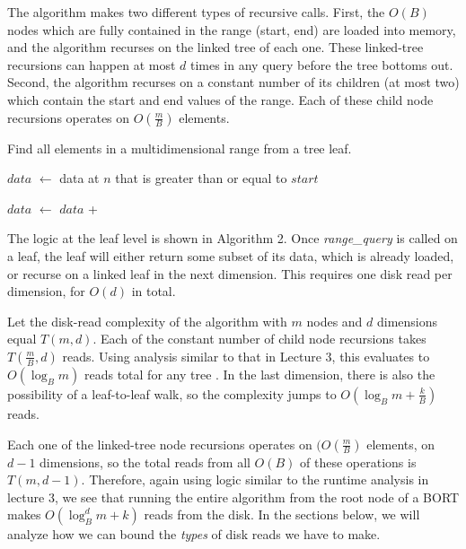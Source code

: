 \documentclass[11pt, oneside]{article}
\newcommand*\Let[2]{\State #1 $\gets$ #2}
\newcommand{\ms}{\textit}
\begin{document}
The algorithm makes two different types of recursive calls. First, the
$O(B)$ nodes which are fully contained in the range (start, end) are loaded into
memory, and the algorithm recurses on the linked tree of each one. These
linked-tree recursions can happen at most $d$ times in any query before the
tree bottoms out. Second, the algorithm recurses on a constant number of its
children (at most two) which contain the start and end values of the range.
Each of these child node recursions operates on $O(\frac{m}{B})$ elements.

\begin{algorithm}[H]
    \caption{Find all elements in a multidimensional range from a tree leaf.}
    \begin{algorithmic}[1]
            \Let{$data$}{data at $n$ that is greater than or equal to $start$}

            \Let{$data$}{$data$ + } 
            \EndIf

            \State {}
        \EndFunction
    \end{algorithmic}
\end{algorithm}

The logic at the leaf level is shown in Algorithm 2. Once \ms{range\_query} is
called on a leaf, the leaf will either return some subset of its data, which is
already loaded, or recurse on a linked leaf in the next dimension. This requires
one disk read per dimension, for $O(d)$ in total. 

Let the disk-read complexity of the algorithm with $m$ nodes and $d$ dimensions
equal $T(m, d)$. Each of the constant number of child node recursions takes
$T(\frac{m}{B}, d)$ reads. Using analysis similar to that in Lecture 3, this
evaluates to $O(\log_B m)$ reads total for any tree \cite{lecture}. In the last
dimension, there is also the possibility of a leaf-to-leaf walk, so the
complexity jumps to $O(\log_B m + \frac{k}{B})$ reads. 

Each one of the linked-tree node recursions operates on $(O(\frac{m}{B})$
elements, on $d-1$ dimensions, so the total reads from all $O(B)$ of these
operations is $T(m, d-1)$. Therefore, again using logic similar to the runtime
analysis in lecture 3, we see that running the entire algorithm from the root
node of a BORT makes $O(\log_B^d m + k)$ reads from the disk. In the sections
below, we will analyze how we can bound the \textit{types} of disk reads we have
to make.
\end{document}
